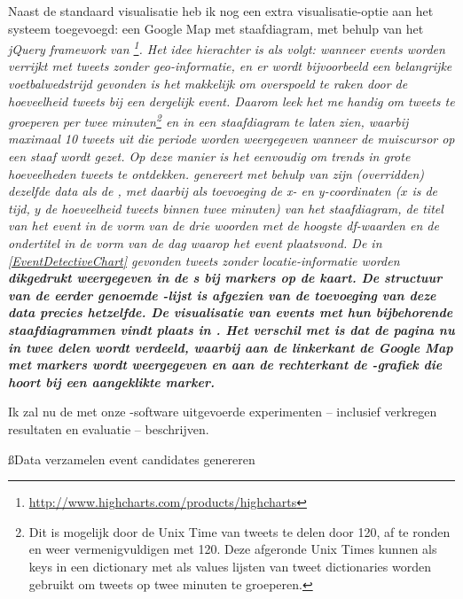 {{Naast de standaard visualisatie heb ik nog een extra visualisatie-optie aan het systeem 
toegevoegd: een Google Map met staafdiagram, met behulp van het \it{jQuery framework} van 
\footnote{\url{http://www.highcharts.com/products/highcharts}}. 
Het idee hierachter is als volgt: wanneer events worden verrijkt 
met tweets zonder geo-informatie, en er wordt bijvoorbeeld een belangrijke 
voetbalwedstrijd gevonden is het makkelijk om overspoeld te raken door de 
hoeveelheid tweets bij een dergelijk event. Daarom leek het me handig om tweets te 
groeperen per twee minuten\footnote{Dit is mogelijk door de Unix Time van tweets 
te delen door 120, af te ronden en weer vermenigvuldigen met 120. Deze afgeronde 
Unix Times kunnen als keys in een dictionary met als values lijsten van tweet 
dictionaries worden gebruikt om tweets op twee minuten te groeperen.} en in een 
staafdiagram te laten zien, waarbij maximaal 10 tweets uit die periode worden 
weergegeven wanneer de muiscursor op een staaf wordt gezet. Op deze manier is 
het eenvoudig om trends in grote hoeveelheden tweets te ontdekken.
\vl
{} genereert met behulp van zijn (\it{overridden})  
dezelfde data als de , met daarbij als toevoeging de \it{x- en 
y-coordinaten} ($x$ is de tijd, $y$ de hoeveelheid tweets binnen twee minuten) van 
het staafdiagram, de \it{titel van het event} in de vorm van de drie woorden met de 
hoogste df-waarden en de \it{ondertitel} in de vorm van de dag waarop het event 
plaatsvond. De in \ref{EventDetectiveChart} gevonden tweets zonder locatie-informatie worden 
\bf{dikgedrukt} weergegeven in de s bij markers op de kaart. De structuur 
van de eerder genoemde -lijst is afgezien van de toevoeging van deze 
data precies hetzelfde.
\vl
De visualisatie van events met hun bijbehorende staafdiagrammen vindt plaats in 
. Het verschil met  is dat de pagina nu 
in twee delen wordt verdeeld, waarbij aan de linkerkant de Google Map met 
markers wordt weergegeven en aan de rechterkant de -grafiek die hoort 
bij een aangeklikte marker.

\label{resultaten}

Ik zal nu de met onze -software uitgevoerde experimenten – inclusief verkregen resultaten 
en evaluatie – beschrijven.

\ss{Data verzamelen event candidates genereren}

}}
